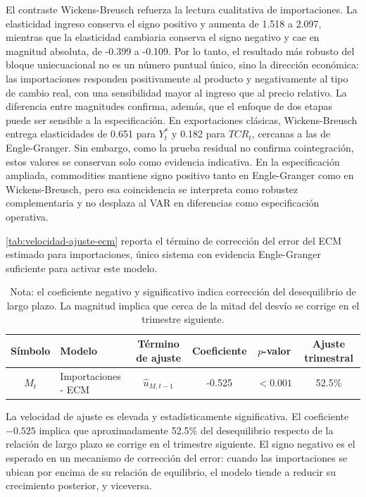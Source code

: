 \documentclass[11pt,a4paper]{article}
\begin{document}
	El contraste Wickens-Breusch refuerza la lectura cualitativa de importaciones.
	La elasticidad ingreso conserva el signo positivo y aumenta de 1.518 a 2.097,
	mientras que la elasticidad cambiaria conserva el signo negativo y cae en
	magnitud absoluta, de -0.399 a -0.109. Por lo tanto, el resultado más robusto
	del bloque uniecuacional no es un número puntual único, sino la dirección
	económica: las importaciones responden positivamente al producto y
	negativamente al tipo de cambio real, con una sensibilidad mayor al ingreso que
	al precio relativo. La diferencia entre magnitudes confirma, además, que el
	enfoque de dos etapas puede ser sensible a la especificación. En exportaciones
	clásicas, Wickens-Breusch entrega elasticidades de 0.651 para \(Y_t^*\) y 0.182
	para \(TCR_t\), cercanas a las de Engle-Granger. Sin embargo, como la prueba
	residual no confirma cointegración, estos valores se conservan solo como
	evidencia indicativa. En la especificación ampliada, commodities mantiene signo
	positivo tanto en Engle-Granger como en Wickens-Breusch, pero esa coincidencia
	se interpreta como robustez complementaria y no desplaza al VAR en diferencias
	como especificación operativa.

	\autoref{tab:velocidad-ajuste-ecm} reporta el término de corrección del error
	del ECM estimado para importaciones, único sistema con evidencia Engle-Granger
	suficiente para activar este modelo.

	\begin{table}[H]
		\centering
		\caption{Velocidad de ajuste del ECM de importaciones.}
		\label{tab:velocidad-ajuste-ecm}
		\small
		\begin{tabular}{clcccc}
			\toprule
			Símbolo & Modelo & Término de ajuste & Coeficiente & \(p\)-valor & Ajuste trimestral \\
			\midrule
			\(M_t\) & Importaciones - ECM & \(\hat{u}_{M,t-1}\) & -0.525 & \(<0.001\) & 52.5\% \\
			\bottomrule
		\end{tabular}
		\caption*{\footnotesize Nota: el coeficiente negativo y significativo indica
			corrección del desequilibrio de largo plazo. La magnitud implica que cerca de
			la mitad del desvío se corrige en el trimestre siguiente.}
	\end{table}

	La velocidad de ajuste es elevada y estadísticamente significativa. El
	coeficiente \(-0.525\) implica que aproximadamente 52.5\% del desequilibrio
	respecto de la relación de largo plazo se corrige en el trimestre siguiente.
	El signo negativo es el esperado en un mecanismo de corrección del error:
	cuando las importaciones se ubican por encima de su relación de equilibrio, el
	modelo tiende a reducir su crecimiento posterior, y viceversa.
\end{document}
